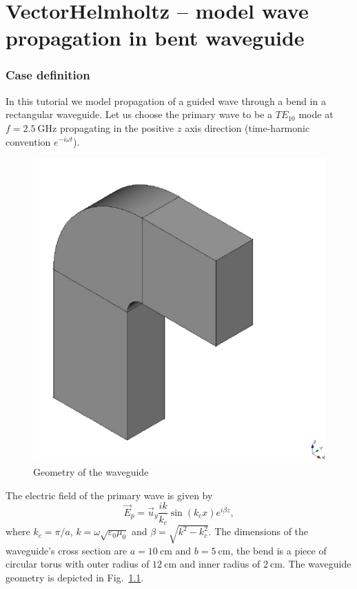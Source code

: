 \chapter{VectorHelmholtz -- model wave propagation in bent waveguide}
\label{vectorhelmholtz-bent-waveguide-chapt}



\subsection*{Case definition}

In this tutorial we model propagation of a guided wave through a bend in a rectangular waveguide.  Let us choose the primary wave to be a $TE_{10}$ mode at $f=2.5~ \mathrm{GHz}$ propagating in the positive $z$ axis direction (time-harmonic convention $e^{-i\omega t}$).

\begin{figure}
\centering
\includegraphics{geom.pdf}
\caption{Geometry of the waveguide}
\label{fig:geometry}
\end{figure}

The electric field of the primary wave is given by \[ \vec E_p = \vec u_y \frac{ik}{k_c}\sin(k_cx)e^{i\beta z},\] where $k_c = \pi / a$, $k = \omega \sqrt{\varepsilon_0 \mu_0}$ and $\beta = \sqrt{k^2-k_c^2}$. The dimensions of the waveguide's cross section are $a=10~ \mathrm{cm}$ and $b=5~ \mathrm{cm}$, the bend is a piece of circular torus with outer radius of $12~ \mathrm{cm}$ and inner radius of $2~ \mathrm{cm}$. The waveguide geometry is depicted in Fig.~\ref{fig:geometry}.

